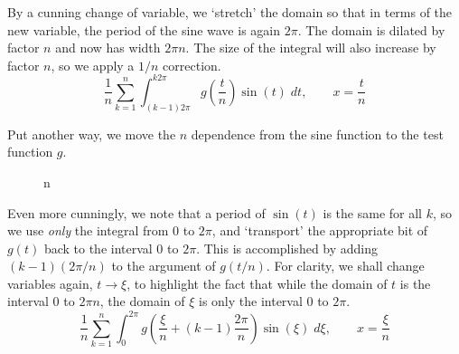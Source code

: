 \documentclass[12pt, a4paper, twoside, openright]{book}
\begin{document}
By a cunning change of variable, we `stretch' the domain so that in terms of the new variable, the period of the sine wave is again $2\pi$.  The domain is dilated by factor $n$ and now has width $2\pi n$.  The size of the integral will also increase by factor $n$, so we apply a $1/n$ correction.
\begin{equation}
\frac{1}{n} \sum_{k=1}^n  \int_{(k-1) 2\pi}^{k 2\pi} g \left(\frac{t}{n} \right) \sin(t) \;dt 
, \qquad x = \frac{t}{n}
\end{equation}

Put another way, we move the $n$ dependence from the sine function to the test function $g$.

\begin{figure}[ht]
\centering
{}
\caption{n}\label{n}
\end{figure}

Even more cunningly, we note that a period of $\sin(t)$ is the same for all $k$, so we use \emph{only} the integral from $0$ to $2\pi$, and `transport' the appropriate bit of $g(t)$ back to the interval $0$ to $2\pi$.  This is accomplished by adding $(k-1) (2\pi /n)$ to the argument of $g(t/n)$.  For clarity, we shall change variables again, $t \to \xi$, to highlight the fact that while the domain of $t$ is the interval $0$ to $2\pi n$, the domain of $\xi$ is only the interval $0$ to $2\pi$.
\begin{equation}
\frac{1}{n} \sum_{k=1}^n  \int_0^{2\pi} g\left(\frac{\xi}{n} + (k-1) \frac{2\pi}{n} \right) \sin(\xi) \;d\xi , \qquad x = \frac{\xi}{n}
\end{equation}
\end{document}
